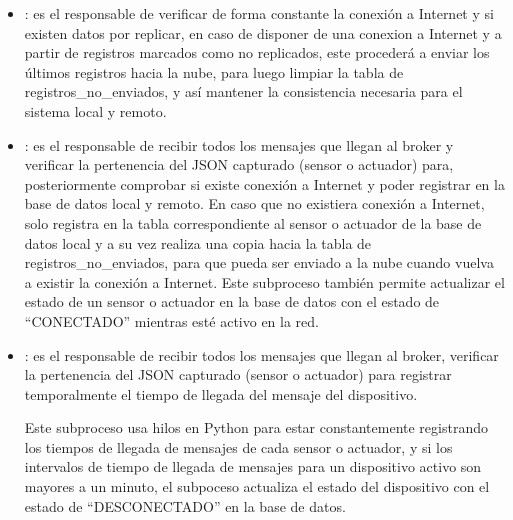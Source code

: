 \begin{itemize}
\item {}: es el responsable de verificar de forma constante la conexión a Internet y si existen datos por replicar, en caso de disponer de una conexion a Internet y a partir de registros marcados como no replicados, este procederá a enviar los últimos registros hacia la nube, para luego limpiar la tabla de registros\_no\_enviados, y así mantener la consistencia necesaria para el sistema local y remoto.

\item {}: es el responsable de recibir todos los mensajes que llegan al broker y verificar la pertenencia del JSON capturado (sensor o actuador) para, posteriormente comprobar si existe conexión a Internet y poder registrar en la base de datos local y remoto. En caso que no existiera conexión a Internet, solo registra en la tabla correspondiente al sensor o actuador de la base de datos local y a su vez realiza una copia hacia la tabla de registros\_no\_enviados, para que pueda ser enviado a la nube cuando vuelva a existir la conexión a Internet. Este subproceso también permite actualizar el estado de un sensor o actuador en la base de datos con el estado de ``CONECTADO'' mientras esté activo en la red.

\item {}: es el responsable de recibir todos los mensajes que llegan al broker, verificar la pertenencia del JSON capturado (sensor o actuador) para registrar temporalmente el tiempo de llegada del mensaje del dispositivo. 

Este subproceso usa hilos en Python para estar constantemente registrando los tiempos de llegada de mensajes de cada sensor o actuador, y si los intervalos de tiempo de llegada de mensajes para un dispositivo activo son mayores a un minuto, el subpoceso actualiza el estado del dispositivo con el estado de ``DESCONECTADO'' en la base de datos.
\end{itemize}

